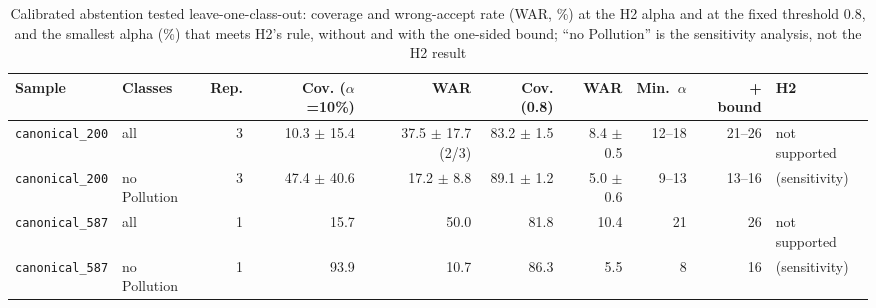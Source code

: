 \begin{table}[t]
\centering
\caption{Calibrated abstention tested leave-one-class-out: coverage and wrong-accept rate (WAR, \%) at the H2 alpha and at the fixed threshold 0.8, and the smallest alpha (\%) that meets H2's rule, without and with the one-sided bound; ``no Pollution'' is the sensitivity analysis, not the H2 result}
\label{tab:gap2}
\footnotesize
\begin{tabular}{@{}llrrrrrrrl@{}}
\toprule
Sample & Classes & Rep. & Cov. ($\alpha$=10\%) & WAR & Cov. (0.8) & WAR & Min.\ $\alpha$ & + bound & H2 \\
\midrule
\texttt{canonical\_200} & all & 3 & 10.3 $\pm$ 15.4 & 37.5 $\pm$ 17.7 (2/3) & 83.2 $\pm$ 1.5 & 8.4 $\pm$ 0.5 & 12--18 & 21--26 & not supported \\
\texttt{canonical\_200} & no Pollution & 3 & 47.4 $\pm$ 40.6 & 17.2 $\pm$ 8.8 & 89.1 $\pm$ 1.2 & 5.0 $\pm$ 0.6 & 9--13 & 13--16 & (sensitivity) \\
\texttt{canonical\_587} & all & 1 & 15.7 & 50.0 & 81.8 & 10.4 & 21 & 26 & not supported \\
\texttt{canonical\_587} & no Pollution & 1 & 93.9 & 10.7 & 86.3 & 5.5 & 8 & 16 & (sensitivity) \\
\bottomrule
\end{tabular}
\end{table}
